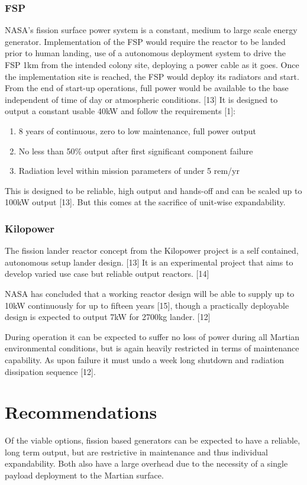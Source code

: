 \documentclass[12pt]{IEEEtran}
\begin{document}
\subsubsection*{FSP}
NASA's fission surface power system is a constant, medium to large scale energy generator. Implementation of the FSP would require the reactor to be landed prior to human landing, use of a autonomous deployment system to drive the
FSP 1km from the intended colony site, deploying a power cable as it goes. Once the implementation
site is reached, the FSP would deploy its radiators and start. From the end of
start-up operations, full power would be available to the base independent of time of day or atmospheric
conditions. [13] It is designed to output a constant usable 40kW and follow the requirements [1]:
\begin{enumerate}
	\item 8 years of continuous, zero to low maintenance, full power output
	\item No less than 50\% output after first significant component failure
	\item Radiation level within mission parameters of under 5 rem/yr
\end{enumerate}

This is designed to be reliable, high output and hands-off and can be scaled up to 100kW output [13]. But this comes at the sacrifice of unit-wise expandability.
\subsubsection*{Kilopower}
The fission lander reactor concept from the Kilopower project is a self contained, autonomous setup lander design. [13] It is an experimental project that aims to develop varied use case but reliable output reactors. [14]

NASA has concluded that a working reactor design will be able to supply up to 10kW continuously for up to fifteen years [15], though a practically deployable design is expected to output 7kW for 2700kg lander. [12]

During operation it can be expected to suffer no loss of power during all Martian environmental conditions, but is again heavily restricted in terms of maintenance capability. As upon failure it must undo a week long shutdown and radiation dissipation sequence [12].

\section{Recommendations}
Of the viable options, fission based generators can be expected to have a reliable, long term output, but are restrictive in maintenance and thus individual expandability. Both also have a large overhead due to the necessity of a single payload deployment to the Martian surface.
\end{document}
